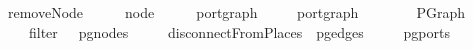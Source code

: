 \ removeNode\ {\isacharcolon}{\isacharcolon}\ {\isachardoublequoteopen}{\isacharparenleft}\ \ \ \ node\ {\isasymRightarrow}\ {\isacharparenleft}\ \ \ \ port{\isacharunderscore}graph\isanewline
{}\ {\isacharparenleft}\ \ \ \ port{\isacharunderscore}graph{\isachardoublequoteclose}\isanewline
\ \ \ {\isachardoublequoteopen}\ \ {\isacharequal}\isanewline
\ \ PGraph\isanewline
\ \ \ \ {\isacharparenleft}filter\ {\isacharparenleft}{\isacharparenleft}{\isasymnoteq}{\isacharparenright}\ \ {\isacharparenleft}pg{\isacharunderscore}nodes\ \isanewline
\ \ \ \ {\isacharparenleft}disconnectFromPlaces\ \ {\isacharparenleft}pg{\isacharunderscore}edges\ \isanewline
\ \ \ \ {\isacharparenleft}pg{\isacharunderscore}ports\ 
